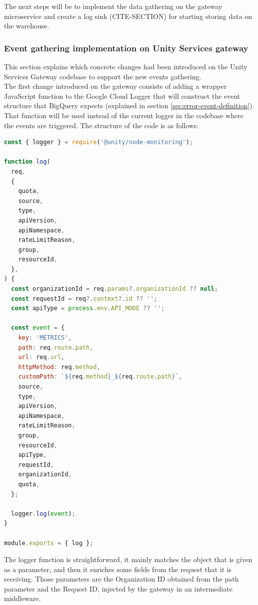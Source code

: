 \documentclass[english, 12pt, a4paper, sci, utf8, a-1b, online]{aaltothesis}
\begin{document}
The next steps will be to implement the data gathering on the gateway microservice and create a log sink (CITE-SECTION) for starting storing data on the warehouse.

\subsubsection{Event gathering implementation on Unity Services gateway}
\label{sec:event-gathering}

This section explains which concrete changes had been introduced on the Unity Services Gateway codebase to support the new events gathering.\\

The first change introduced on the gateway consists of adding a wrapper JavaScript function to the Google Cloud Logger that will construct the event structure that BigQuery expects (explained in section \ref{sec:error-event-definition}). That function will be used instead of the current logger in the codebase where the events are triggered. The structure of the code is as follows:\\

\begin{lstlisting}[language=JavaScript,firstnumber=1]
const { logger } = require('@unity/node-monitoring');

function log(
  req,
  {
    quota,
    source,
    type,
    apiVersion,
    apiNamespace,
    rateLimitReason,
    group,
    resourceId,
  },
) {
  const organizationId = req.params?.organizationId ?? null;
  const requestId = req?.context?.id ?? '';
  const apiType = process.env.API_MODE ?? '';

  const event = {
    key: 'METRICS',
    path: req.route.path,
    url: req.url,
    httpMethod: req.method,
    customPath: `${req.method}_${req.route.path}`,
    source,
    type,
    apiVersion,
    apiNamespace,
    rateLimitReason,
    group,
    resourceId,
    apiType,
    requestId,
    organizationId,
    quota,
  };

  logger.log(event);
}

module.exports = { log };
\end{lstlisting}

The logger function is straightforward, it mainly matches the object that is given as a parameter, and then it enriches some fields from the request that it is receiving. Those parameters are the Organization ID obtained from the path parameter and the Request ID, injected by the gateway in an intermediate middleware.\\
\end{document}
